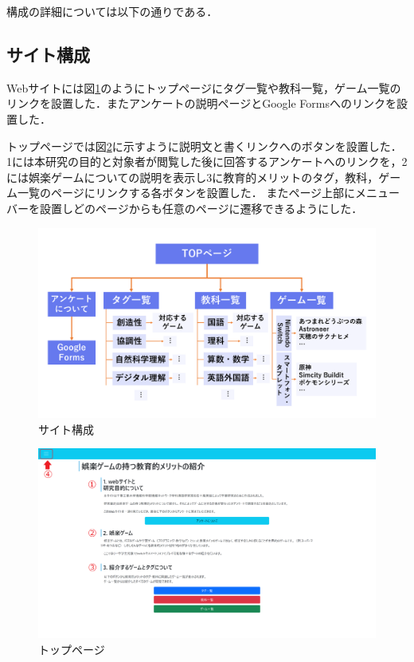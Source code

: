 \documentclass[12pt,a4j,titlepage]{ltjsarticle}
\begin{document}
構成の詳細については以下の通りである．

\subsection{サイト構成}
Webサイトには図\ref{fig:サイト構成}のようにトップページにタグ一覧や教科一覧，ゲーム一覧のリンクを設置した．またアンケートの説明ページとGoogle Formsへのリンクを設置した．

トップページでは図\ref{fig:トップページ}に示すように説明文と書くリンクへのボタンを設置した．
1には本研究の目的と対象者が閲覧した後に回答するアンケートへのリンクを，2には娯楽ゲームについての説明を表示し3に教育的メリットのタグ，教科，ゲーム一覧のページにリンクする各ボタンを設置した．
またページ上部にメニューバーを設置しどのページからも任意のページに遷移できるようにした．

\begin{figure}[H]
\begin{center}
 \includegraphics[keepaspectratio, scale=0.35]{PDF/サイト構成.pdf}
\end{center}
 \caption{サイト構成}
 \label{fig:サイト構成}
\end{figure}

\begin{figure}[H]
\begin{center}
 \includegraphics[keepaspectratio, scale=0.15]{PDF/toppage.pdf}
\end{center}
 \caption{トップページ}
 \label{fig:トップページ}
\end{figure}
\end{document}
